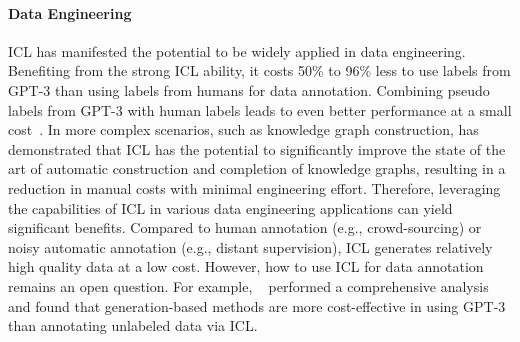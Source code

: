 \paragraph{Data Engineering}
ICL has manifested the potential to be widely applied in data engineering. 
Benefiting from the strong ICL ability,  it costs 50\% to 96\% less to use labels from GPT-3 than using labels from humans for data annotation. Combining pseudo labels from GPT-3 with human labels leads to even better performance at a small cost~\cite{want}.
In more complex scenarios, such as knowledge graph construction, \citet{khorashadizadeh2023exploring} has demonstrated that ICL has the potential to significantly improve the state of the art of automatic construction and completion of knowledge graphs, resulting in a reduction in manual costs with minimal engineering effort. Therefore, leveraging the capabilities of ICL in various data engineering applications can yield significant benefits.
Compared to human annotation (e.g., crowd-sourcing) or noisy automatic annotation (e.g., distant supervision), ICL generates relatively high quality data at a low cost. 
However, how to use ICL for data annotation remains an open question. For example, ~\citet{annotation} performed a comprehensive analysis and found that generation-based methods are more cost-effective in using GPT-3 than annotating unlabeled data via ICL.


